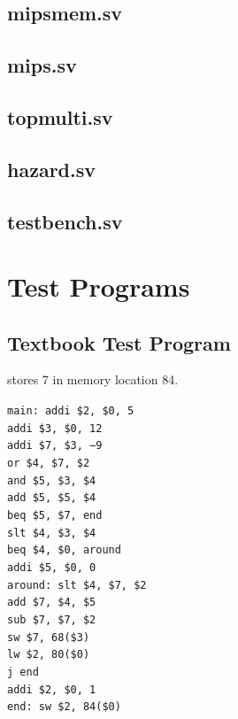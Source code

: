 \documentclass[titlepage,12pt,oneside,a4paper]{article}
\newcommand{\code}[1]{{\texttt{#1}}}
\begin{document}
\begin{multicols}{2}
\subsection{mipsmem.sv}
\label{appendix:dmem}


\subsection{mips.sv}


\subsection{topmulti.sv}


\subsection{hazard.sv}


\subsection{testbench.sv}
\label{appendix:src:mipsparts}


\section{Test Programs}
\label{appendix:tests}

\subsection{Textbook Test Program}
stores 7 in memory location 84.

\code{main: addi \$2, \$0, 5\\
	addi \$3, \$0, 12\\
	addi \$7, \$3, −9\\
	or \$4, \$7, \$2 \\
	and \$5, \$3, \$4\\
	add \$5, \$5, \$4\\
	beq \$5, \$7, end\\
	slt \$4, \$3, \$4\\
	beq \$4, \$0, around\\
	addi \$5, \$0, 0\\
	around: slt \$4, \$7, \$2\\
	add \$7, \$4, \$5\\
	sub \$7, \$7, \$2\\
	sw \$7, 68(\$3)\\
	lw \$2, 80(\$0)\\
	j end\\
	addi \$2, \$0, 1\\
	end: sw \$2, 84(\$0)}\\


\end{multicols}
\end{document}

